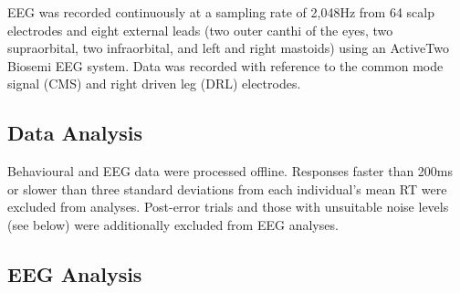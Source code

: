\documentclass[preprint,authoryear,11pt,5p,times,twocolumns]{elsarticle}
\begin{document}
EEG was recorded continuously at a sampling rate of 2,048Hz from 64 scalp electrodes and eight external leads (two outer canthi of the eyes, two supraorbital, two infraorbital, and left and right mastoids) using an ActiveTwo Biosemi EEG system. Data was recorded with reference to the common mode signal (CMS) and right driven leg (DRL) electrodes. 

\subsection{Data Analysis}

Behavioural and EEG data were processed offline. Responses faster than 200ms or slower than three standard deviations from each individual's mean RT were excluded from analyses. Post-error trials and those with unsuitable noise levels (see below) were additionally excluded from EEG analyses.

\subsection{EEG Analysis}
\end{document}
